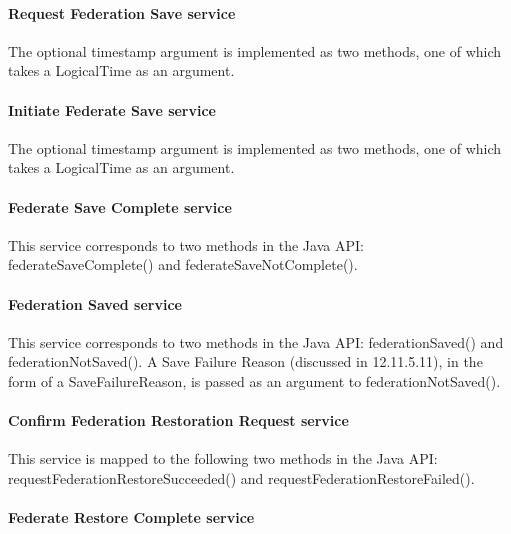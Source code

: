\begin{compactstdpage}
    \paragraph{Request Federation Save service}

    The optional timestamp argument is implemented as two methods, one of which takes a LogicalTime as an argument.

    \paragraph{Initiate Federate Save \rtiinitiated{} service}

    The optional timestamp argument is implemented as two methods, one of which takes a LogicalTime as an argument.

    \paragraph{Federate Save Complete service}

    This service corresponds to two methods in the Java API: federateSaveComplete() and federateSaveNotComplete().

    \paragraph{Federation Saved \rtiinitiated{} service}

    This service corresponds to two methods in the Java API: federationSaved() and federationNotSaved(). A Save Failure Reason (discussed in 12.11.5.11), in the form of a SaveFailureReason, is passed as an argument to federationNotSaved().

    \paragraph{Confirm Federation Restoration Request \rtiinitiated{} service}

    This service is mapped to the following two methods in the Java API: requestFederationRestoreSucceeded() and requestFederationRestoreFailed().

    \paragraph{Federate Restore Complete service}


\end{compactstdpage}
